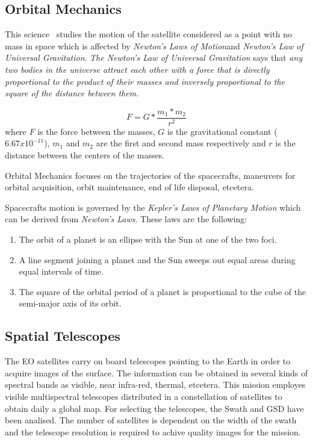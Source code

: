 \subsection{Orbital Mechanics}

This science~\cite{http://en.wikipedia.org/wiki/Orbital_mechanics} studies the motion of the satellite considered as a point with no
mass in space which is affected by \emph{Newton's Laws of Motion}and \emph{Newton's Law of
Universal Gravitation}.
\emph{The Newton's Law of Universal Gravitation} says that \emph{any two bodies in the
universe attract each other with a force that is directly proportional to the
product of their masses and inversely proportional to the square of the distance
between them.}

\begin{equation}
F = G* {\frac {m_1*m_2}{r^2}}
\end{equation}
where $F$ is the force between the masses, $G$ is the gravitational constant
($6.67x10^{-11}$), $m_1$ and $m_2$ are the first and second mass respectively
and $r$ is the distance between the centers of the masses.

Orbital Mechanics focuses on the trajectories of the
spacecrafts, maneuvers for orbital acquisition, orbit maintenance, end of life
disposal, etcetera.

Spacecrafts motion  is governed by the \emph{Kepler's Laws of Planetary Motion}
which can be derived from \emph{Newton's Laws}. These laws are the following:
\begin{enumerate}
\item The orbit of a planet is an ellipse with the Sun at one of the two foci.
\item A line segment joining a planet and the Sun sweeps out equal areas during
  equal intervals of time.
\item The square of the orbital period of a planet is proportional to the cube
  of the semi-major axis of its orbit.
\end{enumerate}


\subsection{Spatial Telescopes }

The \ac{EO} satellites carry on board telescopes pointing to the Earth in order
to acquire images of the surface. The information can be obtained in several
kinds of spectral bands as visible, near infra-red, thermal, etcetera. This
mission employes visible multispectral telescopes distributed in a constellation of satellites
to obtain daily a global map. For selecting the telescopes, the Swath and \ac{GSD}
have been analised. The number of satellites is dependent on the width of the
swath and the telescope resolution is required to achive quality
images for the mission.

